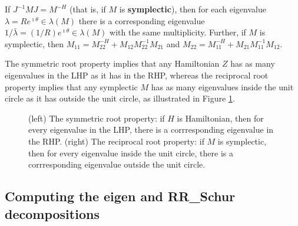 \begin{fact} \label{fact.A.D.D.Ed}
If $J^{-1} M J = M^{-H}$ (that is, if $M$ is {\bf symplectic}), then for each eigenvalue $\lambda=R e^{\imath \theta}  \in \lambda(M)$
there is a corresponding eigenvalue $1/\bar\lambda = (1/R) e^{\imath \theta} \in \lambda(M)$
with the same multiplicity.  Further, if $M$ is symplectic, then $M_{11}=M_{22}^{-H}+M_{12} M_{22}^{-1} M_{21}$ and $M_{22}=M_{11}^{-H}+M_{21} M_{11}^{-1} M_{12}$.
\end{fact}

The symmetric root property implies that any Hamiltonian $Z$ has as many eigenvalues in the LHP as it has in the RHP, whereas
the reciprocal root property implies that any symplectic $M$ has as many eigenvalues inside the unit circle as it has outside the unit circle, as illustrated in Figure \ref{fig:symroot}.
\clearpage

\begin{figure}[h!]
\centerline{\qquad \qquad {}}
\caption{(left) The symmetric root property: if $H$ is Hamiltonian, then for every eigenvalue in the LHP, there is a
corrresponding eigenvalue in the RHP.
(right) The reciprocal root property: if $M$ is symplectic, then for every eigenvalue inside the unit circle, there is a
corrresponding eigenvalue outside the unit circle.}\label{fig:symroot}
\end{figure}

\subsection{Computing the eigen and RR_Schur decompositions}\label{sec.A.D.E}

 \label{sec.A.D.E.A}

